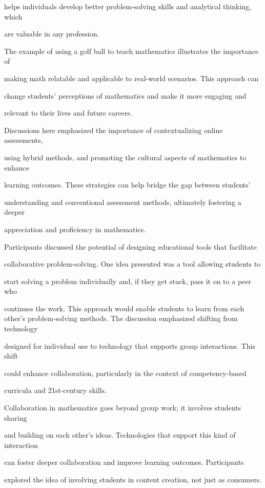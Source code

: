 \documentclass[11pt]{article}
\begin{document}
helps individuals develop better problem-solving skills and analytical thinking, which

are valuable in any profession.

The example of using a golf ball to teach mathematics illustrates the importance of

making math relatable and applicable to real-world scenarios. This approach can

change students' perceptions of mathematics and make it more engaging and

relevant to their lives and future careers.

Discussions here emphasized the importance of contextualizing online assessments,

using hybrid methods, and promoting the cultural aspects of mathematics to enhance

learning outcomes. These strategies can help bridge the gap between students'

understanding and conventional assessment methods, ultimately fostering a deeper

appreciation and proficiency in mathematics.

Participants discussed the potential of designing educational tools that facilitate

collaborative problem-solving. One idea presented was a tool allowing students to

start solving a problem individually and, if they get stuck, pass it on to a peer who

continues the work. This approach would enable students to learn from each other's problem-solving methods. The discussion emphasized shifting from technology

designed for individual use to technology that supports group interactions. This shift

could enhance collaboration, particularly in the context of competency-based

curricula and 21st-century skills.

Collaboration in mathematics goes beyond group work; it involves students sharing

and building on each other's ideas. Technologies that support this kind of interaction

can foster deeper collaboration and improve learning outcomes. Participants

explored the idea of involving students in content creation, not just as consumers.
\end{document}
